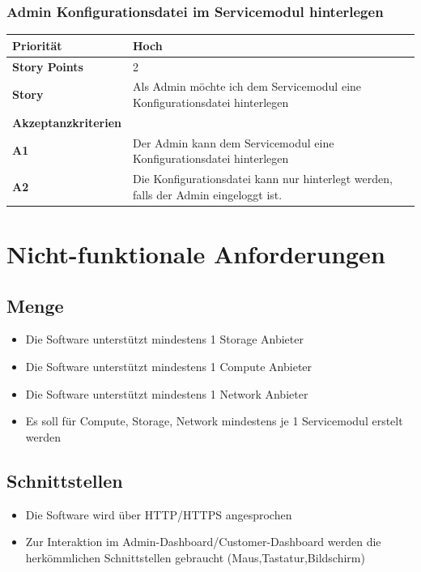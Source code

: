 \documentclass[11pt]{scrartcl}
\begin{document}
 \subsubsection{Admin Konfigurationsdatei im Servicemodul hinterlegen}
     \begin{tabularx}{\linewidth}{l X}
  \textbf{Priorität} & Hoch\\
  \hline
  \textbf{Story Points} & 2\\
  \hline
  \textbf{Story}& Als Admin möchte ich dem Servicemodul eine Konfigurationsdatei hinterlegen\\
  \hline
    \textbf{Akzeptanzkriterien} & \\
    \hline
      \textbf{A1} & Der Admin kann dem Servicemodul eine Konfigurationsdatei hinterlegen\\
  \hline
    \textbf{A2} & Die Konfigurationsdatei kann nur hinterlegt werden, falls der Admin eingeloggt ist.\\
  \hline
 \end{tabularx}

\newpage

\section{Nicht-funktionale Anforderungen}
\subsection{Menge}
\begin{itemize}
  \item Die Software unterstützt mindestens 1 Storage Anbieter
  \item Die Software unterstützt mindestens 1 Compute Anbieter
  \item Die Software unterstützt mindestens 1 Network Anbieter
  \item Es soll für Compute, Storage, Network mindestens je 1 Servicemodul erstelt 
  werden
\end{itemize}

\subsection{Schnittstellen}
\begin{itemize}
  \item Die Software wird über HTTP/HTTPS angesprochen
  \item Zur Interaktion im Admin-Dashboard/Customer-Dashboard werden die herkömmlichen 
  Schnittstellen gebraucht (Maus,Tastatur,Bildschirm)
\end{itemize}
\end{document}
